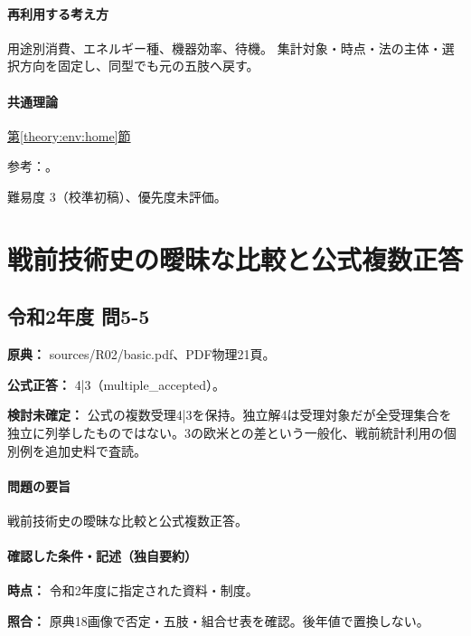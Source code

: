 \paragraph{再利用する考え方} 用途別消費、エネルギー種、機器効率、待機。 集計対象・時点・法の主体・選択方向を固定し、同型でも元の五肢へ戻す。

\paragraph{共通理論} \hyperref[theory:env:home]{第\ref*{theory:env:home}節}

\par 参考：\cite{env59_energy2019}。

\par 難易度 3（校準初稿）、優先度未評価。

\section{戦前技術史の曖昧な比較と公式複数正答}

\subsection{令和2年度 問5-5}
\label{q:r02-reg-basic-5-5}

\noindent\textbf{原典：} sources/R02/basic.pdf、PDF物理21頁。

\textbf{公式正答：} 4|3（multiple\_accepted）。

\par\textbf{検討未確定：} 公式の複数受理4|3を保持。独立解4は受理対象だが全受理集合を独立に列挙したものではない。3の欧米との差という一般化、戦前統計利用の個別例を追加史料で査読。

\paragraph{問題の要旨} 戦前技術史の曖昧な比較と公式複数正答。

\paragraph{確認した条件・記述（独自要約）}\mbox{}\par

\noindent\textbf{時点：} 令和2年度に指定された資料・制度。\par

\noindent\textbf{照合：} 原典18画像で否定・五肢・組合せ表を確認。後年値で置換しない。\par

